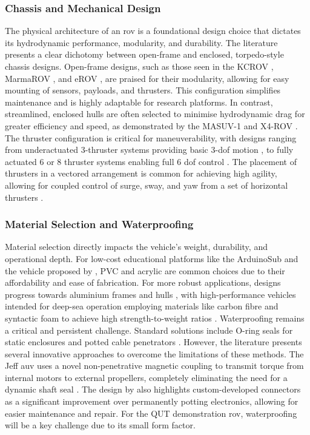 \documentclass[11pt, a4paper]{article}
\begin{document}
\subsubsection{Chassis and Mechanical Design}
The physical architecture of an \gls{rov} is a foundational design choice that dictates its hydrodynamic performance, modularity, and durability. The literature presents a clear dichotomy between open-frame and enclosed, torpedo-style chassis designs. Open-frame designs, such as those seen in the KCROV \cite{6263424}, MarmaROV \cite{8090250}, and eROV \cite{8615595}, are praised for their modularity, allowing for easy mounting of sensors, payloads, and thrusters. This configuration simplifies maintenance and is highly adaptable for research platforms. In contrast, streamlined, enclosed hulls are often selected to minimise hydrodynamic drag for greater efficiency and speed, as demonstrated by the MASUV-1 \cite{5723752} and X4-ROV \cite{7893910}. The thruster configuration is critical for maneuverability, with designs ranging from underactuated 3-thruster systems providing basic 3-\gls{dof} motion \cite{5355247}, to fully actuated 6 or 8 thruster systems enabling full 6 \gls{dof} control \cite{marzbanrad_2011_design, 9965928}. The placement of thrusters in a vectored arrangement is common for achieving high agility, allowing for coupled control of surge, sway, and yaw from a set of horizontal thrusters \cite{10200265, 9659412}.

\subsubsection{Material Selection and Waterproofing}
Material selection directly impacts the vehicle's weight, durability, and operational depth. For low-cost educational platforms like the ArduinoSub and the vehicle proposed by \citet{7506844}, PVC and acrylic are common choices due to their affordability and ease of fabrication. For more robust applications, designs progress towards aluminium frames and hulls \cite{6263424, article}, with high-performance vehicles intended for deep-sea operation employing materials like carbon fibre and syntactic foam to achieve high strength-to-weight ratios \cite{9962007}. Waterproofing remains a critical and persistent challenge. Standard solutions include O-ring seals for static enclosures and potted cable penetrators \cite{marzbanrad_2011_design}. However, the literature presents several innovative approaches to overcome the limitations of these methods. The Jeff \gls{auv} uses a novel non-penetrative magnetic coupling to transmit torque from internal motors to external propellers, completely eliminating the need for a dynamic shaft seal \cite{6907282}. The design by \citet{10313927} also highlights custom-developed connectors as a significant improvement over permanently potting electronics, allowing for easier maintenance and repair. For the QUT demonstration \gls{rov}, waterproofing will be a key challenge due to its small form factor.
\end{document}

